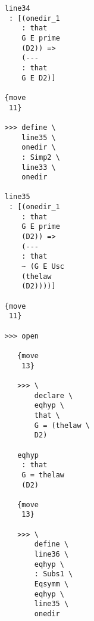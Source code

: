 \documentclass[12pt]{article}
\begin{document}
\begin{verbatim}
                                    line34 
                                     : [(onedir_1 
                                        : that 
                                        G E prime 
                                        (D2)) => 
                                        (--- 
                                        : that 
                                        G E D2)]

                                    {move 
                                     11}

                                    >>> define \
                                        line35 \
                                        onedir \
                                        : Simp2 \
                                        line33 \
                                        onedir

                                    line35 
                                     : [(onedir_1 
                                        : that 
                                        G E prime 
                                        (D2)) => 
                                        (--- 
                                        : that 
                                        ~ (G E Usc 
                                        (thelaw 
                                        (D2))))]

                                    {move 
                                     11}

                                    >>> open

                                       {move 
                                        13}

                                       >>> \
                                           declare \
                                           eqhyp \
                                           that \
                                           G = (thelaw \
                                           D2)

                                       eqhyp 
                                        : that 
                                        G = thelaw 
                                        (D2)

                                       {move 
                                        13}

                                       >>> \
                                           define \
                                           line36 \
                                           eqhyp \
                                           : Subs1 \
                                           Eqsymm \
                                           eqhyp \
                                           line35 \
                                           onedir


\end{verbatim}
\end{document}
